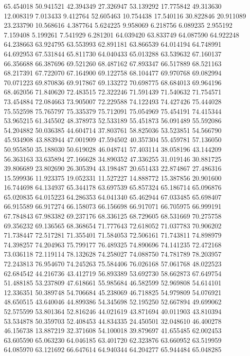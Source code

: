 65.454018
50.941521
42.394349
27.326947
53.139292
17.775842
49.313630
12.008319
7.013433
9.412764
52.605463
10.754438
17.540116
30.822846
20.911089
23.233790
10.568616
4.387764
5.624225
9.958069
6.218756
6.089235
2.955192
7.159408
5.199261
7.541929
6.281201
64.039420
63.833749
64.087590
64.922248
64.238663
63.924795
63.553993
62.891181
63.866539
64.014194
64.748991
64.692953
67.531844
65.811730
64.040433
65.013288
63.539632
67.160137
66.356688
66.387696
69.521260
68.487162
67.893347
66.517889
68.521163
68.217391
67.722070
67.164900
69.122758
68.104477
69.970768
69.082994
70.071223
69.870836
69.917867
69.133272
70.698775
68.684013
69.964196
68.462056
71.840620
72.483515
72.322246
71.591439
71.540632
71.754571
73.454884
72.084663
73.905007
72.229588
74.122493
74.427426
75.444028
75.552598
75.765797
75.335379
75.712091
75.054969
75.454191
74.415344
53.965215
61.345502
48.378973
52.533189
55.451873
56.091489
55.592086
54.204882
50.036385
44.604714
37.803761
58.825036
53.523851
54.566790
45.934908
43.883944
47.001909
47.594502
40.357304
55.459781
57.136050
50.955850
35.188030
50.619028
46.048741
57.403114
38.058196
43.144209
56.363163
33.635894
27.166628
34.890352
47.336255
31.019146
30.881725
39.806689
23.802690
26.305394
43.198487
20.651433
22.874867
27.486316
15.599936
11.923375
19.052331
11.527227
14.888772
15.387856
20.901600
16.744698
64.134937
65.344178
63.697539
65.857324
65.186714
65.096876
65.020835
64.015223
64.286353
64.041340
65.462944
67.033485
65.698407
66.915589
66.917274
66.158073
66.156698
66.917071
66.705975
66.999191
67.784843
67.983382
69.237176
68.336125
68.729605
68.531669
70.275758
69.356232
69.136565
68.368654
71.777643
72.618052
71.037783
70.906202
71.738447
72.517281
71.355401
71.584053
72.506161
71.743811
74.898979
74.398257
74.204963
75.799177
76.489325
74.890696
74.141235
72.472168
73.036118
72.119114
78.132628
74.258027
74.088750
74.781789
78.203957
72.243813
76.954670
74.245263
75.584406
76.026168
57.061768
48.022523
62.684542
44.216736
43.412719
56.893389
53.692730
58.662873
67.649754
51.488185
53.237809
47.618661
55.985684
46.582599
52.969808
54.614101
12.336351
50.389748
54.706684
45.238069
46.718825
54.979809
54.076921
48.650515
43.640046
44.899386
54.345698
52.195250
52.667894
49.699062
52.575599
53.801364
52.816246
44.021619
43.871694
40.011903
43.810394
53.534878
50.359703
52.408453
44.834335
24.450501
32.048610
46.400278
46.156738
13.887219
32.371608
54.100018
39.879697
41.655485
62.002453
63.605590
65.063230
64.046185
63.401720
62.323876
63.660952
63.519959
64.085970
63.121692
66.647614
64.940344
64.204277
65.944484
65.048285
